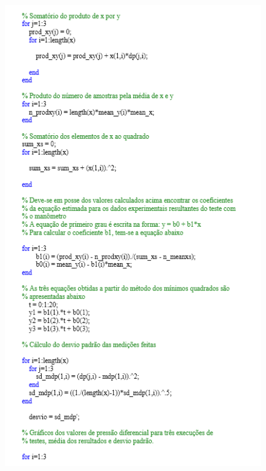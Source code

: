 \begin{apendicesenv}
\begin{figure}[H]
    \centering
      \includegraphics[scale=1.0]{figuras/rotina2.png}
    \label{rotina2}
\end{figure}


\end{apendicesenv}
